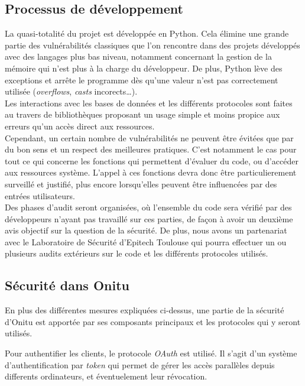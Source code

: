 \subsection{Processus de développement}

La quasi-totalité du projet est développée en Python. Cela élimine une grande partie des vulnérabilités classiques que l'on rencontre dans des projets développés avec des langages plus bas niveau, notamment concernant la gestion de la mémoire qui n'est plus à la charge du développeur. De plus, Python lève des exceptions et arrête le programme dès qu'une valeur n'est pas correctement utilisée (\textit{overflows}, \textit{casts} incorects…).\\

Les interactions avec les bases de données et les différents protocoles sont faites au travers de bibliothèques proposant un usage simple et moins propice aux erreurs qu'un accès direct aux ressources.\\

Cependant, un certain nombre de vulnérabilités ne peuvent être évitées que par du bon sens et un respect des meilleures pratiques. C'est notamment le cas pour tout ce qui concerne les fonctions qui permettent d'évaluer du code, ou d'accéder aux ressources système. L'appel à ces fonctions devra donc être particulierement surveillé et justifié, plus encore lorsqu'elles peuvent être influencées par des entrées utilisateurs.\\

Des phases d'audit seront organisées, où l'ensemble du code sera vérifié par des développeurs n'ayant pas travaillé sur ces parties, de façon à avoir un deuxième avis objectif sur la question de la sécurité. De plus, nous avons un partenariat avec le Laboratoire de Sécurité d'Epitech Toulouse qui pourra effectuer un ou plusieurs audits extérieurs sur le code et les différents protocoles utilisés.

\subsection{Sécurité dans Onitu}

En plus des différentes mesures expliquées ci-dessus, une partie de la sécurité d'Onitu est apportée par ses composants principaux et les protocoles qui y seront utilisés.

Pour authentifier les clients, le protocole \textit{OAuth} est utilisé. Il s'agit d'un système d'authentification par \textit{token} qui permet de gérer les accès parallèles depuis differents ordinateurs, et éventuelement leur révocation.\\

